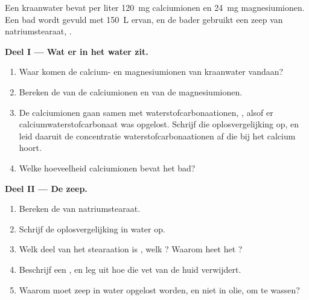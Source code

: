 \begin{problem}
\label{pb:g11:dissolution:1}
Een kraanwater bevat per liter \qty{120}{mg} calciumionen en \qty{24}{mg}
magnesiumionen. Een bad wordt gevuld met \qty{150}{L} ervan, en de bader
gebruikt een zeep van natriumstearaat, .

\medskip
\noindent\textbf{Deel I --- Wat er in het water zit.}
\begin{enumerate}
  \item Waar komen de calcium- en magnesiumionen van kraanwater vandaan?
  \item Bereken de  van de calciumionen en van de
        magnesiumionen.
  \item De calciumionen gaan samen met waterstofcarbonaationen,
        , alsof er calciumwaterstofcarbonaat 
        was opgelost. Schrijf die oplosvergelijking op, en leid daaruit
        de concentratie waterstofcarbonaationen af die bij het calcium
        hoort.
  \item Welke hoeveelheid calciumionen bevat het bad?
\end{enumerate}

\medskip
\noindent\textbf{Deel II --- De zeep.}
\begin{enumerate}[resume]
  \item Bereken de  van natriumstearaat.
  \item Schrijf de oplosvergelijking in water op.
  \item Welk deel van het stearaation is , welk ? Waarom
        heet het ?
  \item Beschrijf een , en leg uit hoe die vet van de huid
        verwijdert.
  \item Waarom moet zeep in water opgelost worden, en niet in olie, om te
        wassen?
\end{enumerate}


\end{problem}
